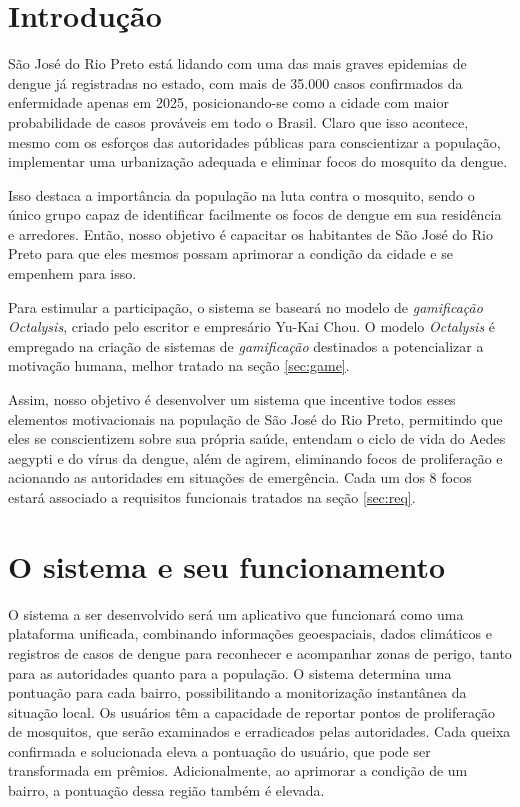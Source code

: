 \documentclass[a5paper, 12pt]{article}
\begin{document}
\section{Introdução}

São José do Rio Preto está lidando com uma das mais graves epidemias de dengue já registradas no estado, com mais de 35.000 casos confirmados da enfermidade apenas em 2025, posicionando-se como a cidade com maior probabilidade de casos prováveis em todo o Brasil. Claro que isso acontece, mesmo com os esforços das autoridades públicas para conscientizar a população, implementar uma urbanização adequada e eliminar focos do mosquito da dengue.

Isso destaca a importância da população na luta contra o mosquito, sendo o único grupo capaz de identificar facilmente os focos de dengue em sua residência e arredores. Então, nosso objetivo é capacitar os habitantes de São José do Rio Preto para que eles mesmos possam aprimorar a condição da cidade e se empenhem para isso.

Para estimular a participação, o sistema se baseará no modelo de \textit{gamificação} \textit{Octalysis}, criado pelo escritor e empresário Yu-Kai Chou.  O modelo \textit{Octalysis} é empregado na criação de sistemas de \textit{gamificação} destinados a potencializar a motivação humana, melhor tratado na seção \ref{sec:game}.

Assim, nosso objetivo é desenvolver um sistema que incentive todos esses elementos motivacionais na população de São José do Rio Preto, permitindo que eles se conscientizem sobre sua própria saúde, entendam o ciclo de vida do Aedes aegypti e do vírus da dengue, além de agirem, eliminando focos de proliferação e acionando as autoridades em situações de emergência. Cada um dos 8 focos estará associado a requisitos funcionais tratados na seção \ref{sec:req}.

\section{O sistema e seu funcionamento}

O sistema a ser desenvolvido será  um aplicativo que funcionará como uma plataforma unificada, combinando informações geoespaciais, dados climáticos e registros de casos de dengue para reconhecer e acompanhar zonas de perigo, tanto para as autoridades quanto para a população. O sistema determina uma pontuação para cada bairro, possibilitando a monitorização instantânea da situação local. Os usuários têm a capacidade de reportar pontos de proliferação de mosquitos, que serão examinados e erradicados pelas autoridades. Cada queixa confirmada e solucionada eleva a pontuação do usuário, que pode ser transformada em prêmios. Adicionalmente, ao aprimorar a condição de um bairro, a pontuação dessa região também é elevada.
\end{document}
